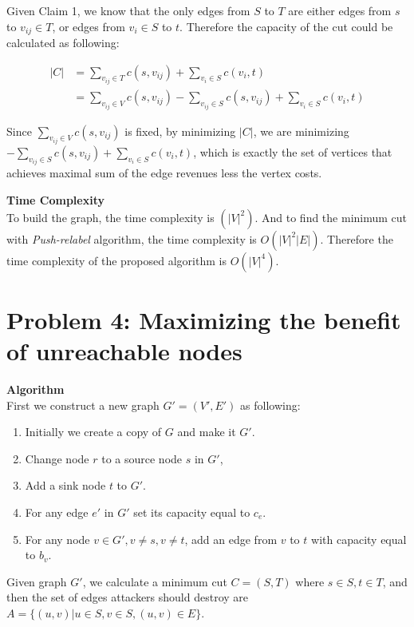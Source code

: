 \documentclass{article}
\newcommand{\Complexity}{\vspace{0.3cm} \noindent\textbf{Time Complexity} \vspace{0.2cm} \\}
\newcommand{\Algorithm}{\textbf{Algorithm} \vspace{0.2cm}\\}
\begin{document}
Given Claim 1, we know that the only edges from $S$ to $T$ are either edges from $s$ to $v_{ij} \in
T$, or edges from $v_i \in S$ to $t$. Therefore the capacity of the cut could be calculated as
following:

\begin{align}
  |C| & = \sum_{v_{ij} \in T} c(s, v_{ij}) + \sum_{v_i \in S} c(v_i, t) \\
  & = \sum_{v_{ij} \in V} c(s, v_{ij}) - \sum_{v_{ij} \in S} c(s, v_{ij}) + \sum_{v_i \in S} c(v_i,
  t) 
\end{align}

Since $\sum_{v_{ij} \in V} c(s, v_{ij})$ is fixed, by minimizing $|C|$, we are minimizing 
$-\sum_{v_{ij} \in S} c(s, v_{ij}) + \sum_{v_i \in S} c(v_i,t)$, which is exactly the set of
vertices that achieves maximal sum of the edge
revenues less the vertex costs.
  
\Complexity
To build the graph, the time complexity is $(|V|^2)$. And to find the minimum cut with
\textit{Push-relabel} algorithm, the time complexity is $O(|V|^2|E|)$. Therefore the time complexity
of the proposed algorithm is $O(|V|^4)$.

\section*{Problem 4: Maximizing the benefit of unreachable nodes}
\Algorithm
First we construct a new graph $G' = (V', E')$ as following:
\begin{enumerate}
  \item Initially we create a copy of $G$ and make it $G'$.
  \item Change node $r$ to a source node $s$ in $G'$,  
  \item Add a sink node $t$ to $G'$.
  \item For any edge $e'$ in $G'$ set its capacity equal to $c_e$.
  \item For any node $v \in G', v \neq s, v\neq t$, add an edge from $v$ to $t$ with capacity
    equal to $b_v$.
\end{enumerate}

Given graph $G'$, we calculate a minimum cut $C = (S, T)$ where $s \in S, t \in T$, and then the set
of edges attackers should destroy are $A = \{(u, v) | u \in S, v \in S, (u, v) \in E \}$. 
\end{document}
